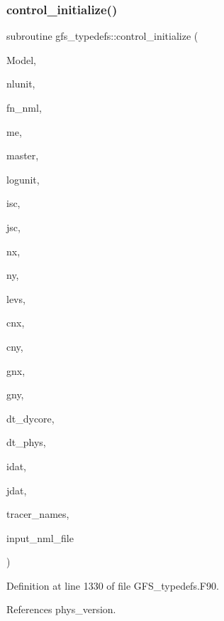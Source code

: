 \subsubsection{control\+\_\+initialize()}
{\footnotesize\ttfamily subroutine gfs\+\_\+typedefs\+::control\+\_\+initialize (\begin{DoxyParamCaption}\item[{class(\textbf{ gfs\+\_\+control\+\_\+type})}]{Model,  }\item[{integer, intent(in)}]{nlunit,  }\item[{character(len=64), intent(in)}]{fn\+\_\+nml,  }\item[{integer, intent(in)}]{me,  }\item[{integer, intent(in)}]{master,  }\item[{integer, intent(in)}]{logunit,  }\item[{integer, intent(in)}]{isc,  }\item[{integer, intent(in)}]{jsc,  }\item[{integer, intent(in)}]{nx,  }\item[{integer, intent(in)}]{ny,  }\item[{integer, intent(in)}]{levs,  }\item[{integer, intent(in)}]{cnx,  }\item[{integer, intent(in)}]{cny,  }\item[{integer, intent(in)}]{gnx,  }\item[{integer, intent(in)}]{gny,  }\item[{real(kind=kind\+\_\+phys), intent(in)}]{dt\+\_\+dycore,  }\item[{real(kind=kind\+\_\+phys), intent(in)}]{dt\+\_\+phys,  }\item[{integer, dimension(8), intent(in)}]{idat,  }\item[{integer, dimension(8), intent(in)}]{jdat,  }\item[{character(len=32), dimension(\+:), intent(in)}]{tracer\+\_\+names,  }\item[{character(len=$\ast$), dimension(\+:), intent(in), pointer}]{input\+\_\+nml\+\_\+file }\end{DoxyParamCaption})}



Definition at line 1330 of file G\+F\+S\+\_\+typedefs.\+F90.



References phys\+\_\+version.

\mbox{\label{namespacegfs__typedefs_ae9d285f1bd5b582fd30674cb734e72e9}} 
